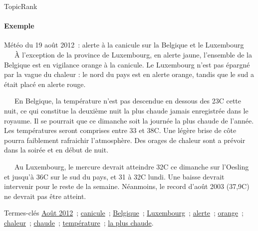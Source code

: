 \begin{frame}{TopicRank}\framesubtitle{Exemple}
  \begin{exampleblock}{\small
    Météo du 19 août 2012~: alerte à la canicule sur la Belgique et le
    Luxembourg
  }\justifying\small
    ~~~À l'exception de la province de Luxembourg, en alerte jaune, l'ensemble
    de la Belgique est en vigilance orange à la canicule. Le Luxembourg n'est
    pas épargné par la vague du chaleur : le nord du pays est en alerte
    orange, tandis que le sud a était placé en alerte rouge.

    ~~~En Belgique, la température n'est pas descendue en dessous des
    23\degre{}C cette nuit, ce qui constitue la deuxième nuit la plus chaude
    jamais enregistrée dans le royaume. Il se pourrait que ce dimanche soit la
    journée la plus chaude de l'année. Les températures seront comprises entre
    33 et 38\degre{}C. Une légère brise de côte pourra faiblement rafraichir
    l'atmosphère. Des orages de chaleur sont a prévoir dans la soirée et en
    début de nuit.

    ~~~Au Luxembourg, le mercure devrait atteindre 32\degre{}C ce dimanche sur
    l'Oesling et jusqu'à 36\degre{}C sur le sud du pays, et 31 à 32\degre{}C
    lundi. Une baisse devrait intervenir pour le reste de la semaine.
    Néanmoins, le record d'août 2003 (37,9\degre{}C) ne devrait pas être
    atteint.

    \begin{exampleblock}{\small Termes-clés}\justifying\small
      \underline{Août 2012}~; \underline{canicule}~;
      \underline{Belgique}~; \underline{Luxembourg}~; \underline{alerte}~;
      \underline{orange}~; \underline{chaleur}~; \underline{chaude}~;
      \underline{température}~; \underline{la plus chaude}.
    \end{exampleblock}
  \end{exampleblock}
\end{frame}

